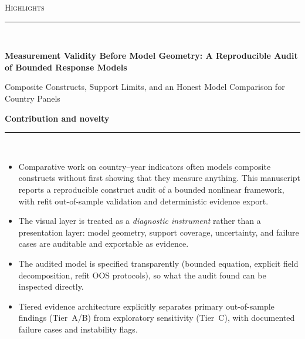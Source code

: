 \documentclass[11pt]{article}
\newcommand{\ManuscriptTitle}{Measurement Validity Before Model Geometry: A Reproducible Audit of Bounded Response Models}
\newcommand{\ManuscriptSubtitle}{Composite Constructs, Support Limits, and an Honest Model Comparison for Country Panels}
\newcommand{\Rule}{\color{black}\rule{\linewidth}{0.6pt}}
\newcommand{\SubRule}{\color{black}\rule{\linewidth}{0.4pt}}
\newcommand{\Section}[1]{\needspace{5\baselineskip}\vspace{0.85em}\noindent\textbf{#1}\\[-0.25em]\SubRule\\[0.45em]}
\begin{document}
\thispagestyle{empty}
\begingroup
{}
\RaggedRight

{\small\textsc{Highlights}}\\[-0.35em]
\Rule\\[0.8em]

\begin{center}
    {\LARGE\bfseries \ManuscriptTitle\par}
    \vspace{0.35em}
    {\large \ManuscriptSubtitle\par}
\end{center}

\vspace{0.35em}

\Section{Contribution and novelty}
\begin{itemize}
    \setlength{\itemsep}{0.40em}
    \item Comparative work on country--year indicators often models composite constructs without first showing that they measure anything. This manuscript reports a reproducible construct audit of a bounded nonlinear framework, with refit out-of-sample validation and deterministic evidence export.
    \item The visual layer is treated as a \emph{diagnostic instrument} rather than a presentation layer: model geometry, support coverage, uncertainty, and failure cases are auditable and exportable as evidence.
    \item The audited model is specified transparently (bounded equation, explicit field decomposition, refit OOS protocols), so what the audit found can be inspected directly.
    \item Tiered evidence architecture explicitly separates primary out-of-sample findings (Tier~A/B) from exploratory sensitivity (Tier~C), with documented failure cases and instability flags.
\end{itemize}
\end{document}

